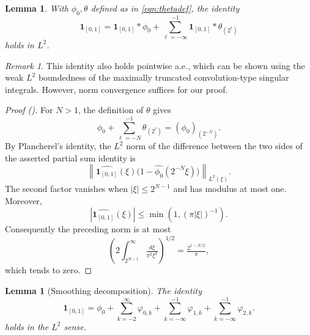 \documentclass[12pt,reqno]{amsart}
\newcommand{\auto}{{({\tiny\faCar})}}
\theoremstyle{plain}
\newtheorem{lemma}[theorem]{Lemma}
\numberwithin{equation}{section}
\theoremstyle{remark}
\newtheorem{rem}{Remark}[section]
\newcommand{\uses}[1]{}
\newcommand{\usesdefs}[1]{}
\begin{document}
\begin{lemma}\label{lem:chardecomp}\uses{}\usesdefs{def:cn-window,def:unipair,defn:window based bump functions}
With $\phi_0,\theta$ defined as in \eqref{eqn:thetadef}, the identity
 \begin{equation}\label{auto:indicator-smoothing-decomposition} \mathbf{1}_{[0,1]} = \mathbf{1}_{[0,1]}* \phi_0 +  \sum_{\ell=-\infty}^{-1} \mathbf{1}_{[0,1]} * \theta_{(2^\ell)}  \end{equation}
holds in $L^2$.
\end{lemma}

\begin{rem}
    This identity also holds pointwise a.e., which can be shown using the weak $L^2$ boundedness of the maximally truncated convolution-type singular integrals. However, norm  convergence   suffices for our proof.
\end{rem}


\begin{proof}[Proof \auto]
For $N>1$, the definition of $\theta$ gives
\[
\phi_0+\sum_{\ell=-N}^{-1}\theta_{(2^\ell)}
=(\phi_0)_{(2^{-N})}.
\]
By Plancherel's identity, the $L^2$ norm of the difference between the two sides of the asserted partial sum identity is
\[
\left\|\widehat{\mathbf1_{[0,1]}}(\xi)
\bigl(1-\widehat{\phi_0}(2^{-N}\xi)\bigr)\right\|_{L^2(\xi)}.
\]
The second factor vanishes when $|\xi|\le2^{N-1}$ and has modulus at most one. Moreover,
\[
|\widehat{\mathbf1_{[0,1]}}(\xi)|
\le\min(1,(\pi|\xi|)^{-1}).
\]
Consequently the preceding norm is at most
\[
\left(2\int_{2^{N-1}}^\infty\tfrac{d\xi}{\pi^2\xi^2}\right)^{1/2}
=\tfrac{2^{1-N/2}}{\pi},
\]
which tends to zero.
\end{proof}


\begin{lemma}[Smoothing decomposition]\label{lem:smoothingdecomp}\uses{lem:chardecomp,lem:bumpbasic}\usesdefs{def:cn-window,def:unipair,defn:window based bump functions}
The identity
\begin{equation}\label{eq:seriesexpansion}
\mathbf{1}_{[0,1]} = \phi_0 + \sum_{k=-2}^\infty \varphi_{0,k}  + \sum_{k=-\infty}^{-1} \varphi_{1,k}+ \sum_{k=-\infty}^{-1}\varphi_{2,k}.
\end{equation}
holds in the $L^2$ sense.
\end{lemma}
\end{document}
